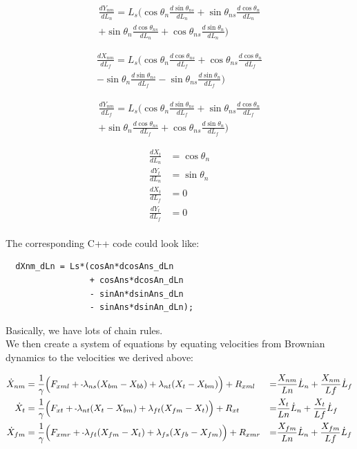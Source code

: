 \documentclass[11pt,twocolumn]{article}
\newcommand{\mn}{\scalebox{0.7}[1.0]{-}}
\begin{document}
\begin{multline}
  \frac{dY_{nm}}{dL_n} = L_s\Big(
  \cos\theta_n\frac{d\sin\theta_{ns}}{dL_n}
  + \sin\theta_{ns}\frac{d\cos\theta_{n}}{dL_n} \\
  + \sin\theta_n\frac{d\cos\theta_{ns}}{dL_n}
  + \cos\theta_{ns}\frac{d\sin\theta_{n}}{dL_n}
  \Big)
\end{multline}

\begin{multline}
  \frac{dX_{nm}}{dL_f} = L_s\Big(
  \cos\theta_n\frac{d\cos\theta_{ns}}{dL_f}
  + \cos\theta_{ns}\frac{d\cos\theta_{n}}{dL_f} \\
  - \sin\theta_n\frac{d\sin\theta_{ns}}{dL_f}
  - \sin\theta_{ns}\frac{d\sin\theta_{n}}{dL_f}
  \Big)
\end{multline}

\begin{multline}
  \frac{dY_{nm}}{dL_f} = L_s\Big(
  \cos\theta_n\frac{d\sin\theta_{ns}}{dL_f}
  + \sin\theta_{ns}\frac{d\cos\theta_{n}}{dL_f} \\
  + \sin\theta_n\frac{d\cos\theta_{ns}}{dL_f}
  + \cos\theta_{ns}\frac{d\sin\theta_{n}}{dL_f}
  \Big)
\end{multline}

\begin{align}
  \frac{dX_{t}}{dL_n} &= \cos\theta_n\\
  \frac{dY_{t}}{dL_n} &= \sin\theta_n\\
  \frac{dX_{t}}{dL_f} &= 0\\
  \frac{dY_{t}}{dL_f} &= 0\\
\end{align}

The corresponding C++ code could look like:
\begin{verbatim}
  dXnm_dLn = Ls*(cosAn*dcosAns_dLn
                 + cosAns*dcosAn_dLn
                 - sinAn*dsinAns_dLn
                 - sinAns*dsinAn_dLn);
\end{verbatim}
Basically, we have lots of chain rules.\\

We then create a system of equations by equating velocities from Brownian dynamics to the velocities
we derived above:

\onecolumn

\begin{align}
  \dot{X}_{nm} &= \frac{1}{\gamma} \Big(F_{xml} + \mn \lambda_{ns}(X_{bm} - X_{bb})
  + \lambda_{nt}(X_{t } - X_{bm}) \Big) + R_{xml}
  &=& \frac{X_{nm}}{Ln}\dot{L}_n + \frac{X_{nm}}{Lf}\dot{L}_f\\
  \dot{X}_{t } &= \frac{1}{\gamma} \Big(F_{xt } + \mn \lambda_{nt}(X_{t } - X_{bm})
  + \lambda_{ft}(X_{fm} - X_{t }) \Big) + R_{xt }
  &=& \frac{X_{t}}{Ln}\dot{L}_n + \frac{X_{t}}{Lf}\dot{L}_f\\
  \dot{X}_{fm} &= \frac{1}{\gamma} \Big(F_{xmr} + \mn \lambda_{ft}(X_{fm} - X_{t })
  + \lambda_{fs}(X_{fb} - X_{fm}) \Big) + R_{xmr}
  &=& \frac{X_{fm}}{Ln}\dot{L}_n + \frac{X_{fm}}{Lf}\dot{L}_f
\end{align}
\end{document}
